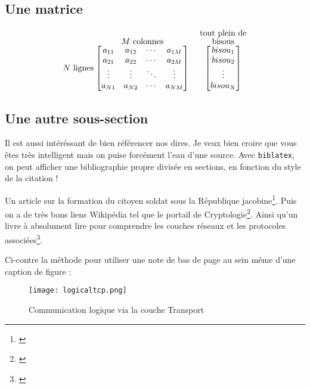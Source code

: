 \subsection{Une matrice}
\[
  N\textrm{ lignes}
  \stackrel{\mbox{$M$ colonnes}}{%
    \begin{bmatrix}
    a_{11} & a_{12} & \cdots & a_{1M} \\
    a_{21} & a_{22} & \cdots & a_{2M} \\
    \vdots & \vdots & \ddots & \vdots \\
    a_{N1} & a_{N2} & \cdots & a_{NM}
    \end{bmatrix}%
  }\ \quad
  \stackrel{\stackrel{\mbox{tout plein de}}{\mbox{bisous}}}{%
    \begin{bmatrix}
    bisou_1 \\
    bisou_2 \\
    \vdots \\
    bisou_N
    \end{bmatrix}%
   }
\]

\subsection{Une autre sous-section}
Il est aussi intéréssant de bien référencer nos dires.  Je veux bien croire que vous êtes très
intelligent mais on puise forcément l'eau d'une source. Avec \texttt{biblatex}, on peut afficher une
bibliographie propre divisée en sections, en fonction du style de la citation !

Un article sur la formation du citoyen soldat sous la République
jacobine\footnote{\cite{guiragossian:hal-02115427}}. Puis on a de très bons liens Wikipédia tel que
le portail de Cryptologie\footnote{\cite{crypto}}. Ainsi qu'un livre à absolument lire pour
comprendre les couches réseaux et les protocoles associées\footnote{\cite{topdown}}.

Ci-contre la méthode pour utiliser une note de bas de page au sein même d'une caption de figure : 

\begin{figure}[H]
    \centering
    \texttt{[image: logicaltcp.png]}
    \caption[Communication logique via la couche Transport]{Communication logique via la couche Transport\protect\footnotemark}
    \label{logicalT}
\end{figure}

